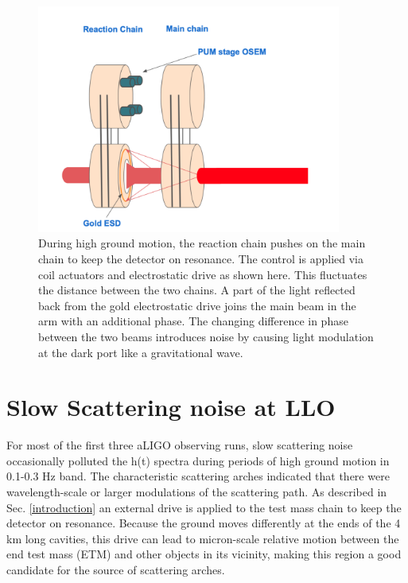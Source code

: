 \documentclass[12pt]{iopart}
\begin{document}
\begin{figure}[h]
    \centering
    \includegraphics[width=10cm]{mirror-diagram1.eps}
    \caption{During high ground motion, the reaction chain pushes on the main chain  to keep the detector on resonance. The control is applied via coil actuators and electrostatic drive as shown here. This fluctuates the distance between the two chains. A part of the light reflected back from the gold electrostatic drive joins the main beam in the arm with an additional phase. The changing difference in phase between the two beams introduces noise by causing light modulation at the dark port like a gravitational wave.}
    \label{fig:mirror_diag}
\end{figure}


\section{Slow Scattering noise at LLO}\label{m0r0_scattering}
For most of the first three aLIGO observing runs, slow scattering noise occasionally polluted the h(t) spectra during periods of high ground motion in 0.1-0.3 Hz band. The characteristic scattering arches indicated that there were wavelength-scale or larger modulations of the scattering path.
As described in Sec. \ref{introduction} an external drive is applied to the test mass chain to keep the detector on resonance. Because the ground moves differently at the ends of the 4 km long cavities, this drive can lead to micron-scale relative motion between the end test mass (ETM) and other objects in its vicinity, making this region a good candidate for the source of scattering arches.
\end{document}

